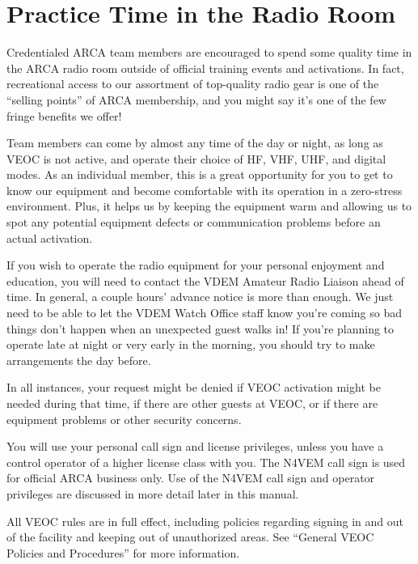 \documentclass[pdflatex,letterpaper,twoside,12pt]{book}
\begin{document}

\section{Practice Time in the Radio Room}

Credentialed ARCA team members are encouraged to spend some quality time in the ARCA radio room outside of official training events and activations.  In fact, recreational access to our assortment of top-quality radio gear is one of the ``selling points'' of ARCA membership, and you might say it's one of the few fringe benefits we offer!

Team members can come by almost any time of the day or night, as long as VEOC is not active, and operate their choice of HF, VHF, UHF, and digital modes.  As an individual member, this is a great opportunity for you to get to know our equipment and become comfortable with its operation in a zero-stress environment.  Plus, it helps us by keeping the equipment warm and allowing us to spot any potential equipment defects or communication problems before an actual activation.

If you wish to operate the radio equipment for your personal enjoyment and education, you will need to contact the VDEM Amateur Radio Liaison ahead of time.  In general, a couple hours' advance notice is more than enough.  We just need to be able to let the VDEM Watch Office staff know you're coming so bad things don't happen when an unexpected guest walks in!  If you're planning to operate late at night or very early in the morning, you should try to make arrangements the day before.

In all instances, your request might be denied if VEOC activation might be needed during that time, if there are other guests at VEOC, or if there are equipment problems or other security concerns.

You will use your personal call sign and license privileges, unless you have a control operator of a higher license class with you.  The N4VEM call sign is used for official ARCA business only.  Use of the N4VEM call sign and operator privileges are discussed in more detail later in this manual.

All VEOC rules are in full effect, including policies regarding signing in and out of the facility and keeping out of unauthorized areas.  See ``General VEOC Policies and Procedures'' for more information.
\end{document}
